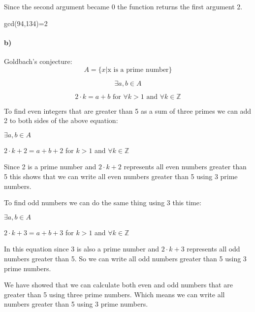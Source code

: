 \documentclass[12pt]{article}
\begin{document}
Since the second argument became 0 the function returns the first argument 2.

gcd(94,134)=2
\paragraph{b)}
Goldbach's conjecture:
$$A= \{x|\text{x is a prime number}\}$$

$$\exists a,b \in A$$

$$2\cdot k = a+b \text{ for }\forall k>1 \text{ and } \forall k\in \mathbb{Z}$$

To find even integers that are greater than 5 as a sum of three primes we can add 2 to both sides of the above equation:

$\exists a,b \in A$

$2\cdot k+2 = a+b+2$ for $k>1$ and $\forall k\in \mathbb{Z}$

Since 2 is a prime number and $2\cdot k +2$ represents all even numbers greater than 5 this shows that we can write all even numbers greater than 5 using 3 prime numbers.

To find odd numbers we can do the same thing using 3 this time:

$\exists a,b \in A$

$2\cdot k+3 = a+b+3$ for $k>1$ and $\forall k\in \mathbb{Z}$

In this equation since 3 is also a prime number and $2\cdot k+3$ represents all odd numbers greater than 5. So we can write all odd numbers greater than 5 using 3 prime numbers.

We have showed that we can calculate both even and odd numbers that are greater than 5 using three prime numbers. Which means we can write all numbers greater than 5 using 3 prime numbers.
\end{document}
